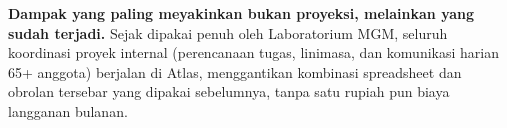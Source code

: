 \begin{remark}
\textbf{Dampak yang paling meyakinkan bukan proyeksi, melainkan yang sudah terjadi.} Sejak dipakai penuh oleh Laboratorium MGM, seluruh koordinasi proyek internal (perencanaan tugas, linimasa, dan komunikasi harian 65+ anggota) berjalan di Atlas, menggantikan kombinasi spreadsheet dan obrolan tersebar yang dipakai sebelumnya, tanpa satu rupiah pun biaya langganan bulanan.
\end{remark}
